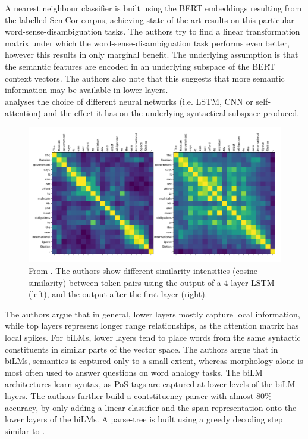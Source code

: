 \documentclass[a4paper,12pt,twoside,openright]{report}
\begin{document}
A nearest neighbour classifier is built using the BERT embeddings resulting from the labelled SemCor corpus, achieving state-of-the-art results on this particular word-sense-disambiguation tasks.
The authors try to find a linear transformation matrix under which the word-sense-disambiguation task performs even better, however this results in only marginal benefit.
The underlying assumption is that the semantic features are encoded in an underlying subspace of the BERT context vectors.
The authors also note that this suggests that more semantic information may be available in lower layers. \\

\cite{peters18} analyses the choice of different neural networks (i.e. LSTM, CNN or self-attention) and the effect it has on the underlying syntactical subspace produced.

\begin{figure}[H]
	\center
  \includegraphics[width=0.9\linewidth]{./assets/relatedwork/self_attention_analysis.png}
  \caption{From \cite{peters18}. The authors show different similarity intensities (cosine similarity) between token-pairs using the output of a 4-layer LSTM (left), and the output after the first layer (right).}
  \label{fig:embeddings_by_language}
\end{figure}

The authors argue that in general, lower layers mostly capture local information, while top layers represent longer range relationships, as the attention matrix has local spikes.
For biLMs, lower layers tend to place words from the same syntactic constituents in similar parts of the vector space.
The authors argue that in biLMs, semantics is captured only to a small extent, whereas morphology alone is most often used to answer questions on word analogy tasks.
The biLM architectures learn syntax, as PoS tags are captured at lower levels of the biLM layers.
The authors further build a contstituency parser with almost 80\% accuracy, by only adding a linear classifier and the span representation onto the lower layers of the biLMs.
A parse-tree is built using a greedy decoding step similar to \cite{joshi19b}.
\end{document}
